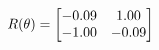 \documentclass[preview]{standalone}
\begin{document}
\begin{align*}
\special{dvisvgm:raw <g id='unique000'>}R(\theta) = \begin{bmatrix}-0.09 & 1.00\\-1.00 & -0.09\end{bmatrix}\special{dvisvgm:raw </g>}
\end{align*}
\end{document}

